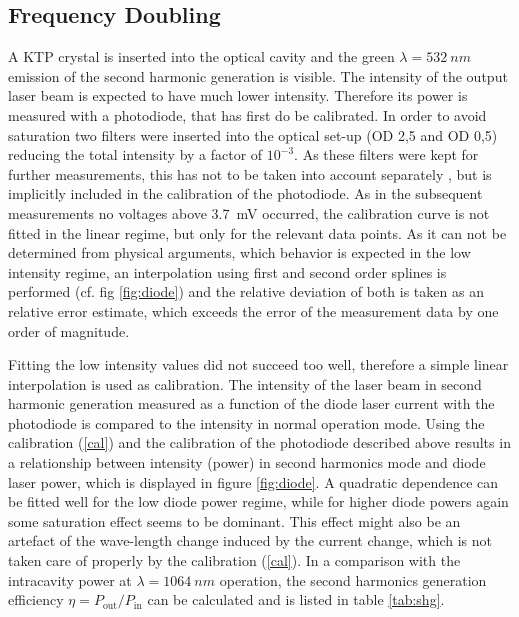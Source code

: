 \documentclass[a4paper]{scrartcl}
\numberwithin{equation}{section}
\numberwithin{figure}{section}
\numberwithin{table}{section}
\newcommand{\Formel}[1]{(\ref{#1})}
\begin{document}
\FloatBarrier

\subsection{Frequency Doubling}
A KTP crystal is inserted into the optical cavity and the green $\lambda =\SI{532}{nm}$ emission of the second harmonic generation is visible. The intensity of the output laser beam is expected to have much lower intensity. Therefore its power is measured with a photodiode, that has first do be calibrated. In order to avoid saturation two filters were inserted into the optical set-up (OD 2,5 and OD 0,5) reducing the total intensity by a factor of $10^{-3}$. As these filters were kept for further measurements, this has not to be taken into account separately , but is implicitly included in the calibration of the photodiode. As in the subsequent measurements no voltages above \SI{3.7}{mV} occurred, the calibration curve is not fitted in the linear regime, but only for the relevant data points. As it can not be determined from physical arguments, which behavior is expected in the low intensity regime, an interpolation using first and second order splines is performed (cf. fig \ref{fig:diode}) and the relative deviation of both is taken as an relative error estimate, which exceeds the error of the measurement data by one order of magnitude. 

Fitting the low intensity values did not succeed too well, therefore a simple linear interpolation is used as calibration. The intensity of the laser beam in second harmonic generation measured as a function of the diode laser current with the photodiode is compared to the intensity in normal operation mode. Using the calibration \Formel{cal} and the calibration of the photodiode described above results in a relationship between intensity (power) in second harmonics mode and diode laser power, which is displayed in figure \ref{fig:diode}. A quadratic dependence can be fitted well for the low diode power regime, while for higher diode powers again some saturation effect seems to be dominant. This effect might also be an artefact of the wave-length change induced by the current change, which is not taken care of properly by the calibration \Formel{cal}. In a comparison with the intracavity power at $\lambda=\SI{1064}{nm}$ operation, the second harmonics generation efficiency $\eta=P_\text{out}/P_\text{in}$ can be calculated and is listed in table \ref{tab:shg}.
\end{document}
